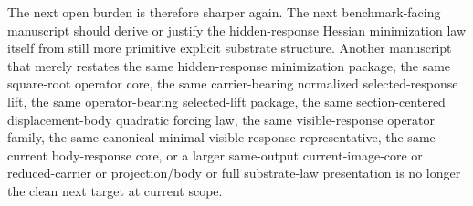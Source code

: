 \documentclass[11pt]{article}
\begin{document}
The next open burden is therefore sharper again. The next benchmark-facing manuscript should derive or justify the hidden-response Hessian minimization law itself from still more primitive explicit substrate structure. Another manuscript that merely restates the same hidden-response minimization package, the same square-root operator core, the same carrier-bearing normalized selected-response lift, the same operator-bearing selected-lift package, the same section-centered displacement-body quadratic forcing law, the same visible-response operator family, the same canonical minimal visible-response representative, the same current body-response core, or a larger same-output current-image-core or reduced-carrier or projection/body or full substrate-law presentation is no longer the clean next target at current scope.
\end{document}
